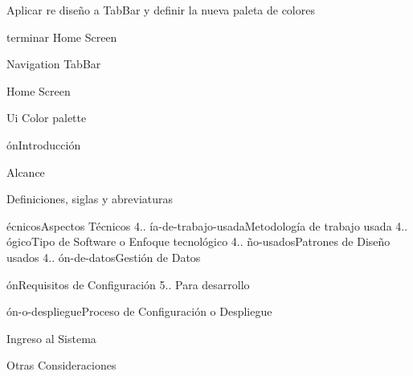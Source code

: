 
\begin{DoxyItemize}
\item Aplicar re diseño a Tab\+Bar y definir la nueva paleta de colores
\end{DoxyItemize}

terminar Home Screen

Navigation Tab\+Bar

Home Screen

Ui Color palette


\begin{DoxyEnumerate}
\item ónIntroducción
\item Alcance
\item Definiciones, siglas y abreviaturas
\item écnicosAspectos Técnicos 4.. ía-\/de-\/trabajo-\/usadaMetodología de trabajo usada 4.. ógicoTipo de Software o Enfoque tecnológico 4.. ño-\/usadosPatrones de Diseño usados 4.. ón-\/de-\/datosGestión de Datos
\item ónRequisitos de Configuración 5.. Para desarrollo
\item ón-\/o-\/despliegueProceso de Configuración o Despliegue
\item Ingreso al Sistema
\item Otras Consideraciones 
\end{DoxyEnumerate}